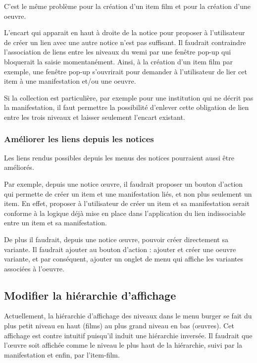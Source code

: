 C’est le même problème pour la création d’un \gls{item} film et pour la création d’une \gls{oeuvre}.  

L’encart qui apparait en haut à droite de la notice pour proposer à l’utilisateur de créer un lien avec une autre notice n’est pas suffisant. Il faudrait contraindre l’association de liens entre les niveaux du \gls{wemi} par une fenêtre pop-up qui bloquerait la saisie momentanément. Ainsi, à la création d’un \gls{item} film par exemple, une fenêtre pop-up s’ouvrirait pour demander à l’utilisateur de lier cet \gls{item} à une \gls{manifestation} et/ou une \gls{oeuvre}.  

Si la collection est particulière, par exemple pour une institution qui ne décrit pas la \gls{manifestation}, il faut permettre la possibilité d’enlever cette obligation de lien entre les trois niveaux et laisser seulement l’encart existant. 

\subsubsection{Améliorer les liens depuis les notices}  

Les liens rendus possibles depuis les menus des notices pourraient aussi être améliorés.  

Par exemple, depuis une notice œuvre, il faudrait proposer un bouton d’action qui permette de créer un \gls{item} et une \gls{manifestation} liés, et non plus seulement un \gls{item}. En effet, proposer à l’utilisateur de créer un \gls{item} et sa \gls{manifestation} serait conforme à la logique déjà mise en place dans l’application du lien indissociable entre un \gls{item} et sa \gls{manifestation}.  

De plus il faudrait, depuis une notice œuvre, pouvoir créer directement sa \gls{variante}. Il faudrait ajouter au bouton d’action : ajouter et créer une \gls{oeuvre} \gls{variante}, et par conséquent, ajouter un onglet de menu qui affiche les \gls{variante}s associées à l’\gls{oeuvre}. 

\subsection{Modifier la hiérarchie d’affichage}  

Actuellement, la hiérarchie d’affichage des niveaux dans le menu burger se fait du plus petit niveau en haut (films) au plus grand niveau en bas (œuvres). Cet affichage est contre intuitif puisqu’il induit une hiérarchie inversée. Il faudrait que l’œuvre soit affichée comme le niveau le plus haut de la hiérarchie, suivi par la \gls{manifestation} et enfin, par l’\gls{item}-film.  

